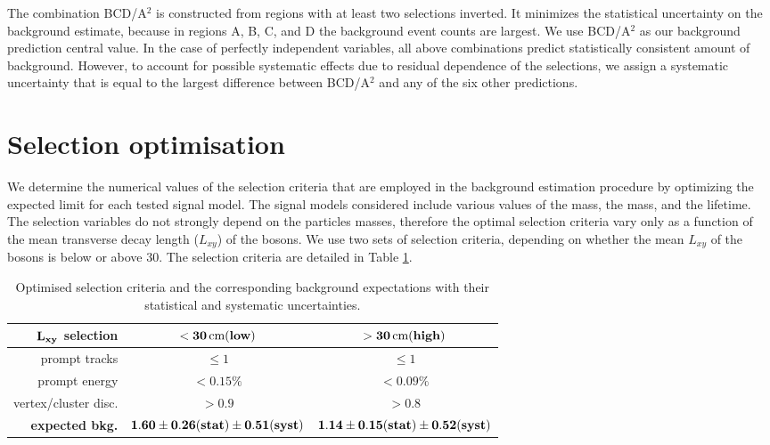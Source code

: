 The combination BCD/A$^2$ is constructed from regions with at least two selections inverted.
It minimizes the statistical uncertainty on the background estimate, because in regions 
A, B, C, and D
the background event counts are largest. We use BCD/A$^2$ as our background prediction
central value.
In the case of perfectly independent 
variables, all above combinations predict statistically consistent  amount of background. 
However, to account for possible systematic
effects due to residual dependence of the selections, we assign a systematic uncertainty 
that is equal to the largest difference 
between BCD/A$^2$ and any of the six other predictions.

\section{Selection optimisation}
\label{sec:cutvalues}
We determine the numerical values of the selection criteria that are employed in the background estimation procedure 
by optimizing the expected limit for each tested signal model.
The signal models considered include various values of the \Higgs mass, the \X mass, and the \X lifetime.
The selection variables
do not strongly depend on the particles masses, therefore the optimal selection criteria
vary only as a function of the
mean transverse decay length ($L_{xy}$)
of the \X bosons. We use two sets of selection criteria,
depending on whether the mean
$L_{xy}$ of the \X bosons is below or above 30\cm. The selection criteria are
detailed in Table \ref{tab:background}.

\begin{table}[htbp]
\centering
\begin{tabular}{r|c|c}
$\bf L_{xy}$ \bf selection &\bf  $\bf <30\,\text{cm} (low)$ & \bf  $\bf >30\,\text{cm} (high)$ \\
\hline
prompt tracks & $\leq1$ & $\leq1$ \\
prompt energy & $<0.15\%$ & $<0.09\%$ \\
vertex/cluster disc. & $>0.9$ & $>0.8$  \\
\hline
\bf expected bkg. & $\bf 1.60\pm0.26(stat)\pm0.51(syst)$ & $\bf 1.14\pm0.15(stat)\pm0.52(syst)$ \\
\end{tabular}
\caption{Optimised selection criteria and the corresponding background expectations with their statistical and systematic uncertainties.\label{tab:background}}
\end{table}

